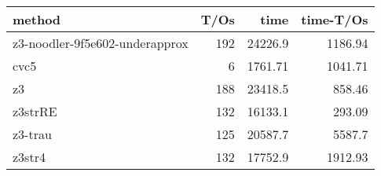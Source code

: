 \begin{tabular}{lrrr}
\hline
 method                         &   T/Os &     time &   time-T/Os \\
\hline
 z3-noodler-9f5e602-underapprox &    192 & 24226.9  &     1186.94 \\
 cvc5                           &      6 &  1761.71 &     1041.71 \\
 z3                             &    188 & 23418.5  &      858.46 \\
 z3strRE                        &    132 & 16133.1  &      293.09 \\
 z3-trau                        &    125 & 20587.7  &     5587.7  \\
 z3str4                         &    132 & 17752.9  &     1912.93 \\
\hline
\end{tabular}
